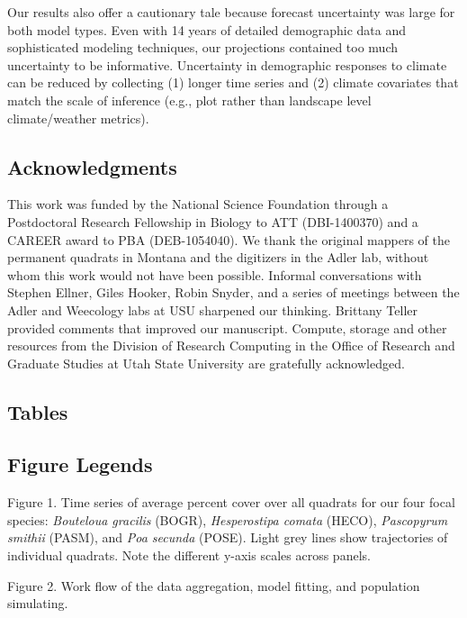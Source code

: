 \documentclass[12pt,]{article}
\begin{document}
Our results also offer a cautionary tale because forecast uncertainty
was large for both model types. Even with 14 years of detailed
demographic data and sophisticated modeling techniques, our projections
contained too much uncertainty to be informative. Uncertainty in
demographic responses to climate can be reduced by collecting (1) longer
time series and (2) climate covariates that match the scale of inference
(e.g., plot rather than landscape level climate/weather metrics).

\subsection{Acknowledgments}\label{acknowledgments}

This work was funded by the National Science Foundation through a
Postdoctoral Research Fellowship in Biology to ATT (DBI-1400370) and a
CAREER award to PBA (DEB-1054040). We thank the original mappers of the
permanent quadrats in Montana and the digitizers in the Adler lab,
without whom this work would not have been possible. Informal
conversations with Stephen Ellner, Giles Hooker, Robin Snyder, and a
series of meetings between the Adler and Weecology labs at USU sharpened
our thinking. Brittany Teller provided comments that improved our
manuscript. Compute, storage and other resources from the Division of
Research Computing in the Office of Research and Graduate Studies at
Utah State University are gratefully acknowledged.

\pagebreak{}

\setcounter{page}{29}

\subsection{Tables}\label{tables}

\pagebreak{}

\subsection{Figure Legends}\label{figure-legends}

Figure 1. Time series of average percent cover over all quadrats for our
four focal species: \emph{Bouteloua gracilis} (BOGR), \emph{Hesperostipa
comata} (HECO), \emph{Pascopyrum smithii} (PASM), and \emph{Poa secunda}
(POSE). Light grey lines show trajectories of individual quadrats. Note
the different y-axis scales across panels.

Figure 2. Work flow of the data aggregation, model fitting, and
population simulating.
\end{document}
